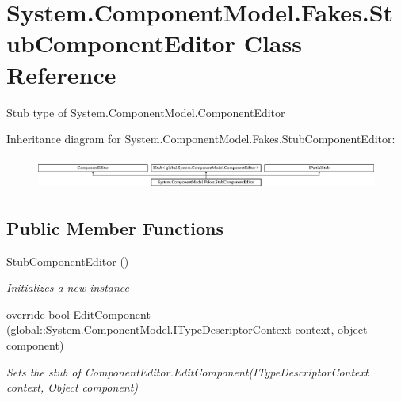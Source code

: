 \hypertarget{class_system_1_1_component_model_1_1_fakes_1_1_stub_component_editor}{\section{System.\-Component\-Model.\-Fakes.\-Stub\-Component\-Editor Class Reference}
\label{class_system_1_1_component_model_1_1_fakes_1_1_stub_component_editor}
}


Stub type of System.\-Component\-Model.\-Component\-Editor 


Inheritance diagram for System.\-Component\-Model.\-Fakes.\-Stub\-Component\-Editor\-:\begin{figure}[H]
\begin{center}
\leavevmode
\includegraphics[height=1.060606cm]{class_system_1_1_component_model_1_1_fakes_1_1_stub_component_editor}
\end{center}
\end{figure}
\subsection*{Public Member Functions}
\begin{DoxyCompactItemize}
\item 
\hyperlink{class_system_1_1_component_model_1_1_fakes_1_1_stub_component_editor_aa9a4135698cc4fc9db30c39ab6f702c9}{Stub\-Component\-Editor} ()
\begin{DoxyCompactList}\small\item\em Initializes a new instance\end{DoxyCompactList}\item 
override bool \hyperlink{class_system_1_1_component_model_1_1_fakes_1_1_stub_component_editor_a9e71ab2748057fffb70cb35b2908d684}{Edit\-Component} (global\-::\-System.\-Component\-Model.\-I\-Type\-Descriptor\-Context context, object component)
\begin{DoxyCompactList}\small\item\em Sets the stub of Component\-Editor.\-Edit\-Component(\-I\-Type\-Descriptor\-Context context, Object component)\end{DoxyCompactList}\end{DoxyCompactItemize}
